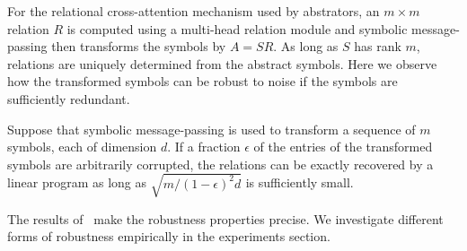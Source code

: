 For the relational cross-attention mechanism used by abstrators, an \(m\times m\) relation \(R\) is computed using a multi-head relation module and symbolic message-passing then transforms the symbols by
\(A = SR\). %
As long as \(S\) has rank \(m\), relations are uniquely determined from the abstract symbols. Here we observe how the transformed symbols can be robust to noise if the symbols are sufficiently redundant.

\begin{result}
Suppose that symbolic message-passing is used to transform a sequence of $m$ symbols, each of dimension $d$. If a fraction $\epsilon$ of the entries of the transformed symbols are arbitrarily corrupted, the relations can be exactly recovered by a linear program as long as $\sqrt{m/(1-\epsilon)^2d}$ is sufficiently small.
\end{result}

The results of~\cite{model_repair} make the robustness properties precise. We investigate different forms of robustness empirically in the experiments section.
